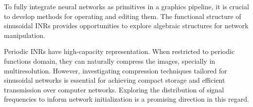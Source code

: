 


To fully integrate neural networks as primitives in a graphics pipeline, it is crucial to develop methods for operating and editing them. The functional structure of sinusoidal INRs provides opportunities to explore algebraic structures for network manipulation. 


Periodic INRs have high-capacity representation. When restricted to periodic functions domain, they can naturally compress the images, specially in multiresolution. However, investigating compression techniques tailored for sinusoidal networks is essential for achieving compact storage and efficient transmission over computer networks. Exploring the distribution of signal frequencies to inform network initialization is a promising direction in this regard.




